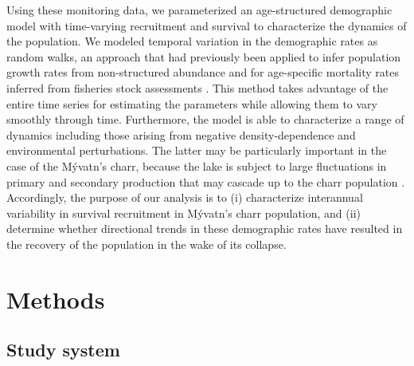 \documentclass[11pt]{article}
\begin{document}
Using these monitoring data, 
we parameterized an age-structured demographic model with time-varying recruitment and survival 
to characterize the dynamics of the population.
We modeled temporal variation in the demographic rates as random walks, 
an approach that had previously been applied 
to infer population growth rates from non-structured abundance 
\citep{zeng1998, ives2012detecting}
and for age-specific mortality rates inferred from fisheries stock assessments 
\citep{nielsen2014estimation}. 
This method takes advantage of the entire time series for estimating the parameters 
while allowing them to vary smoothly through time. 
Furthermore, the model is able to characterize a range of dynamics including those
arising from negative density-dependence and environmental perturbations.
The latter may be particularly important in the case of the M\'{y}vatn's charr,
because the lake is subject to large fluctuations in primary and secondary production
that may cascade up to the charr population 
\citep{einarsson2004myvatn, einarsson2004clad, gardarsson2004population}.
Accordingly, the purpose of our analysis is to 
(i) characterize interannual variability in survival recruitment 
in M\'{y}vatn's charr population, 
and (ii) determine whether directional trends in these demographic rates have
resulted in the recovery of the population in the wake of its collapse. 





\section*{Methods} 

\subsection*{Study system} 
\end{document}
